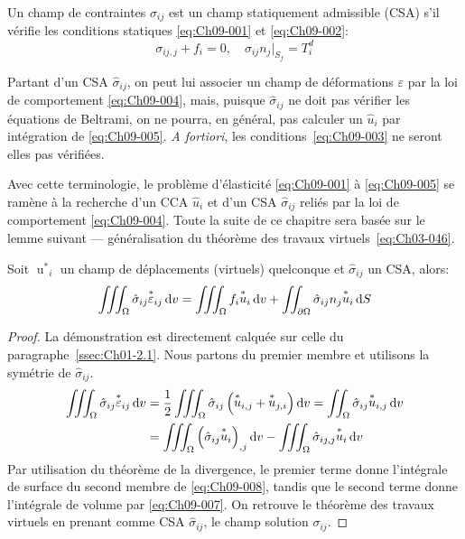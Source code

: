 \begin{deff}
    Un champ de contraintes $\hat{\sigma}_{ij}$ est un champ statiquement admissible (CSA) s'il vérifie les conditions statiques \eqref{eq:Ch09-001} et \eqref{eq:Ch09-002}:
    \begin{equation}
        \sigma_{ij,j} + f_i = 0,\quad \sigma_{ij} n_j |_{S_f} = T_i^d
        \label{eq:Ch09-007}
    \end{equation}
\end{deff}

Partant d'un CSA $\hat{\sigma}_{ij}$, on peut lui associer un champ de déformations $\varepsilon$ par la loi de comportement \eqref{eq:Ch09-004}, mais, puisque $\hat{\sigma}_{ij}$ ne doit pas vérifier les équations de Beltrami, on ne pourra, en général, pas calculer un $\hat{u}_i$ par intégration de \eqref{eq:Ch09-005}.
\textit{A fortiori}, les conditions~\eqref{eq:Ch09-003} ne seront elles pas vérifiées.

Avec cette terminologie, le problème d'élasticité \eqref{eq:Ch09-001} à \eqref{eq:Ch09-005} se ramène à la recherche d'un CCA $\hat{u}_i$ et d'un CSA $\hat{\sigma}_{ij}$ reliés par la loi de comportement \eqref{eq:Ch09-004}.
Toute la suite de ce chapitre sera basée sur le lemme suivant --- généralisation du théorème des travaux virtuels~\eqref{eq:Ch03-046}.

\begin{lem}
Soit ${\mathop{u}^{\ast}}_i$ un champ de déplacements (virtuels) quelconque et $\hat{\sigma}_{ij}$ un CSA, alors:
\begin{equation}
\iiint_{\Omega} \hat{\sigma}_{ij} {\mathop{\varepsilon}^{\ast}}_{ij} \mathop{\mathrm{{}d}}\mathopen{} v = \iiint_{\Omega} f_{i} {\mathop{u}^{\ast}}_i \mathop{\mathrm{{}d}}\mathopen{} v + \iint_{\partial \Omega} \hat{\sigma}_{ij} n_j {\mathop{u}^{\ast}}_i \mathop{\mathrm{{}d}}\mathopen{} S\label{eq:Ch09-008}
\end{equation}
\end{lem}
\begin{proof}
    La  démonstration  est directement calquée sur celle du paragraphe~\ref{ssec:Ch01-2.1}.
    Nous partons du premier membre et utilisons la symétrie de $\hat{\sigma}_{ij}$.
    \begin{align*}
        \iiint_{\Omega} \hat{\sigma}_{ij} {\mathop{\varepsilon}^{\ast}}_{ij} \mathop{\mathrm{{}d}}\mathopen{} v &= \frac{1}{2} \iiint_{\Omega} \hat{\sigma}_{ij} \left( {\mathop{u}^{\ast}}_{i,j} + {\mathop{u}^{\ast}}_{j,i}  \right) \mathop{\mathrm{{}d}}\mathopen{} v = \iint_{\Omega} \hat{\sigma}_{ij} {\mathop{u}^{\ast}}_{i,j} \mathop{\mathrm{{}d}}\mathopen{} v \\
        & = \iiint_{\Omega} \left( \hat{\sigma}_{ij} {\mathop{u}^{\ast}}_{i} \right)_{,j} \mathop{\mathrm{{}d}}\mathopen{} v - \iiint_{\Omega} \hat{\sigma}_{ij,j}  {\mathop{u}^{\ast}}_{i} \mathop{\mathrm{{}d}}\mathopen{} v
    \end{align*}
    Par utilisation du théorème de la divergence, le premier terme donne l'intégrale de surface du second membre de \eqref{eq:Ch09-008}, tandis que le second terme donne l'intégrale de volume par \eqref{eq:Ch09-007}.
    On retrouve le théorème des travaux virtuels en prenant comme CSA $\hat{\sigma}_{ij}$, le champ solution $\sigma_{ij}$.
\end{proof}

